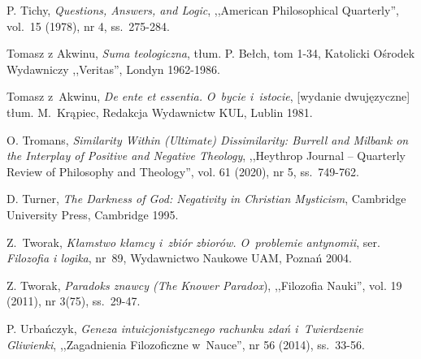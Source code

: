 \begin{thebibliography}{100}
P. Tichy, \textit{Questions, Answers, and Logic}, ,,American Philosophical Quarterly'', vol.~15 (1978), nr 4, ss.~275-284.



Tomasz z Akwinu, \textit{Suma teologiczna}, tłum. P. Bełch, tom 1-34, Katolicki Ośrodek Wydawniczy ,,Veritas'', Londyn 1962-1986.

Tomasz z~Akwinu, \textit{De ente et essentia.} \textit{O~bycie i~istocie}, [wydanie dwujęzyczne] tłum. M.~Krąpiec, Redakcja Wydawnictw KUL, Lublin 1981.


O. Tromans, \textit{Similarity Within (Ultimate) Dissimilarity: Burrell and Milbank on the Interplay of Positive and Negative Theology},
,,Heythrop Journal -- Quarterly Review of Philosophy and Theology'', vol. 61 (2020), nr 5, ss.~749-762.

D. Turner, \textit{The Darkness of God: Negativity in Christian Mysticism}, Cambridge University Press, Cambridge 1995.


Z.~Tworak, \textit{Kłamstwo kłamcy i~zbiór zbiorów. O~problemie antynomii}, ser. \textit{Filozofia i logika}, nr~89, Wydawnictwo Naukowe UAM, Poznań 2004.

Z. Tworak, \textit{Paradoks znawcy (The Knower Paradox}), ,,Filozofia Nauki'', vol. 19 (2011), nr 3(75), ss.~29-47.


P. Urbańczyk, \textit{Geneza intuicjonistycznego rachunku zdań i~Twierdzenie Gliwienki}, ,,Zagadnienia Filozoficzne w~Nauce'', nr 56 (2014), ss.~33-56.


\end{thebibliography}
